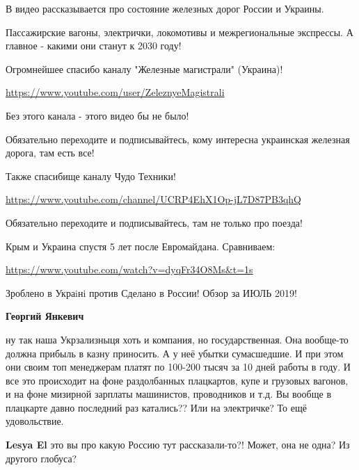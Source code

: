 \begin{itemize}
\begin{itemize}
{В видео рассказывается про состояние железных дорог России и Украины.

Пассажирские вагоны, электрички, локомотивы и межрегиональные экспрессы. А
главное - какими они станут к 2030 году! 

Огромнейшее спасибо каналу "Железные магистрали" (Украина)!

\url{https://www.youtube.com/user/ZeleznyeMagistrali}

Без этого канала - этого видео бы не было!

Обязательно переходите и подписывайтесь, кому интересна украинская железная
дорога, там есть все!

Также спасибище каналу Чудо Техники!

\url{https://www.youtube.com/channel/UCRP4EhX1Op-jL7D87PB3qhQ}

Обязательно переходите и подписывайтесь, там не только про поезда!

Крым и Украина спустя 5 лет после Евромайдана. Сравниваем:

\url{https://www.youtube.com/watch?v=dyqFr34O8Ms&t=1s}

Зроблено в Украiнi против Сделано в России! Обзор за ИЮЛЬ 2019!
}

 
\textbf{Георгий Янкевич} 

ну так наша Укрзализныця хоть и компания, но государственная. Она вообще-то
должна прибыль в казну приносить. А у неё убытки сумасшедшие. И при этом они
своим топ менеджерам платят по 100-200 тысяч за 10 дней работы в году. И все
это происходит на фоне раздолбанных плацкартов, купе и грузовых вагонов, и на
фоне мизирной зарплаты машинистов, проводников и т.д. Вы вообще в плацкарте
давно последний раз катались?? Или на электричке? То ещё удовольствие.


 
\textbf{Lesya El} это вы про какую Россию тут рассказали-то?! Может, она не одна? Из другого глобуса?

 

\end{itemize}
\end{itemize}
